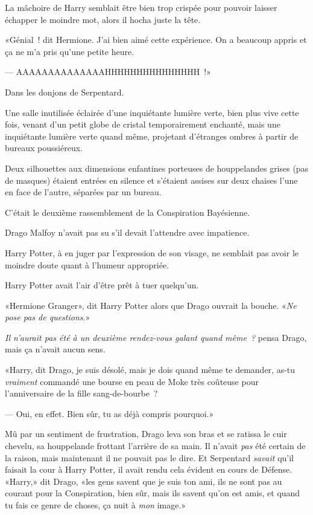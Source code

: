 La mâchoire de Harry semblait être bien trop crispée pour pouvoir laisser échapper le moindre mot, alors il hocha juste la tête.

«Génial~! dit Hermione. J'ai bien aimé cette expérience. On a beaucoup appris et ça ne m'a pris qu'une petite heure.

--- AAAAAAAAAAAAAAHHHHHHHHHHHHHHH~!»

\later

Dans les donjons de Serpentard.

Une salle inutilisée éclairée d'une inquiétante lumière verte, bien plus vive cette fois, venant d'un petit globe de cristal temporairement enchanté, mais une inquiétante lumière verte quand même, projetant d'étranges ombres à partir de bureaux poussiéreux.

Deux silhouettes aux dimensions enfantines porteuses de houppelandes grises (pas de masques) étaient entrées en silence et s'étaient assises sur deux chaises l'une en face de l'autre, séparées par un bureau.

C'était le deuxième rassemblement de la Conspiration Bayésienne.

Drago Malfoy n'avait pas su s'il devait l'attendre avec impatience.

Harry Potter, à en juger par l'expression de son visage, ne semblait pas avoir le moindre doute quant à l'humeur appropriée.

Harry Potter avait l'air d'être prêt à tuer quelqu'un.

«Hermione Granger», dit Harry Potter alors que Drago ouvrait la bouche. «\emph{Ne pose pas de questions}.»

\emph{Il n'aurait pas été à un deuxième rendez-vous galant quand même~?} pensa Drago, mais ça n'avait aucun sens.

«Harry, dit Drago, je suis désolé, mais je dois quand même te demander, as-tu \emph{vraiment} commandé une bourse en peau de Moke très coûteuse pour l'anniversaire de la fille sang-de-bourbe~?

--- Oui, en effet. Bien sûr, tu as déjà compris pourquoi.»

Mû par un sentiment de frustration, Drago leva son bras et se ratissa le cuir chevelu, sa houppelande frottant l'arrière de sa main. Il n'avait \emph{pas} été certain de la raison, mais maintenant il ne pouvait pas le dire. Et Serpentard \emph{savait} qu'il faisait la cour à Harry Potter, il avait rendu cela évident en cours de Défense. «Harry,» dit Drago, «les gens savent que je suis ton ami, ils ne sont pas au courant pour la Conspiration, bien sûr, mais ils savent qu'on est amis, et quand tu fais ce genre de choses, ça nuit à \emph{mon} image.»

